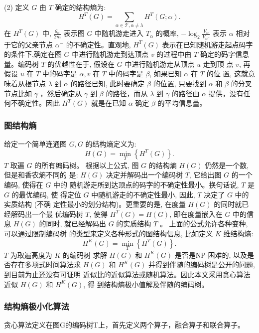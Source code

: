 \documentclass[a4paper]{apa6}
\begin{document}
(2) 定义 \(G\) 由 \(T\) 确定的结构熵为:
$$
H^{T}(G)=\sum_{\alpha \in \mathcal{T}, \alpha \neq \lambda} H^{T}(G ; \alpha) .
$$
在 \(H^{T}(G)\) 中, \(\frac{g_{\alpha}}{2 m}\) 表示图 \(G\) 中随机游走进入 \(T_{\alpha}\) 的概率, \(-\log_{2} \frac{V_{\alpha}}{V_{\alpha^{-}}}\) 表示 \(\alpha\) 相对于它的父亲节点 \(\alpha^{-}\) 的不确定性。直观地, \(H^{T}(G)\) 表示在已知随机游走起点码字的条件下,确定在图 \(G\) 中进行随机游走到达顶点 \(v\) 的过程中由 \(T\) 确定的码字信息量。编码树 \(T\) 的优越性在于, 假设在 \(G\) 中进行随机游走从顶点 \(u\) 走到顶 点 \(v\), 再假设 \(u\) 在 \(T\) 中的码字是 \(\alpha, v\) 在 \(T\) 中的码字是 \(\beta\), 如果已知 \(\alpha\) 在 \(T\) 的位 置, 这就意味着从根节点 \(\lambda\) 到 \(\alpha\) 的路径已知, 此时要确定 \(\beta\) 的位置, 只要找到 \(\alpha\) 和 \(\beta\) 的分叉节点比如 \(\gamma\) ，然后确定从 \(\gamma\) 到 \(\beta\) 的路径，而从 \(\lambda\) 到 \(\gamma\) 的路径由 \(\alpha\) 提供，没有任何不确定性。因此 \(H^{T}(G)\) 就是在已知 \(\alpha\) 确定 \(\beta\) 的平均信息量。

\subsubsection{图结构熵}
\label{sec:org630a8f0}
给定一个简单连通图 \(G, G\) 的结构熵定义为:
$$
H(G)=\min _{T}\left\{H^{T}(G)\right\} .
$$
\(T\) 取遍 \(G\) 的所有编码树。
根据以上公式, 图 \(G\) 的结构熵 \(H(G)\) 仍然是一个数, 但是和香农熵不同的 是: \(H(G)\) 决定并解码出一个编码树 \(T\), 它给出图 \(G\) 的一个编码, 使得在 \(G\) 中的 随机游走所到达顶点的码字的不确定性最小。换句话说, \(T\) 是 \(G\) 的最优编码, 使 得定位 \(G\) 中随机游走的不确定性最小, 因此, \(T\) 决定了 \(G\) 中的实质结构 (不确 定性最小的划分结构)。更重要的是, 在度量 \(H(G)\) 的同时就已经解码出一个最 优编码树 \(T\), 使得 \(H^{T}(G)=H(G)\), 即在度量嵌入在 \(G\) 中的信息 \(H(G)\) 的同时, 就已经解码出 \(G\) 的实质结构 \(T\) 。 上面的公式允许各种变种, 可以通过限制编码树 的类型来定义各种形式的图结构信息, 比如定义 \(K\) 维结构熵:
$$
H^{K}(G)=\min _{T}\left\{H^{T}(G)\right\} .
$$
\(T\) 为取遍高度为 \(K\) 的编码树
求解 \(H(G)\) 和 \(H^{K}(G)\) 是否是NP-困难的, 以及是否存在多项式时间算法求 \(H(G)\) 和 \(H^{K}(G)\) 并得到伴随的编码树是公开的问题, 到目前为止还没有可证明 近似比的近似算法或随机算法。因此本文采用贪心算法近似 \(H(G)\) 和 \(H^{K}(G)\), 得 到结构熵极小值解及伴随的编码树。

\subsubsection{结构熵极小化算法}
\label{sec:org32fbeeb}
贪心算法定义在图G的编码树T上，首先定义两个算子，融合算子和联合算子。
\end{document}
